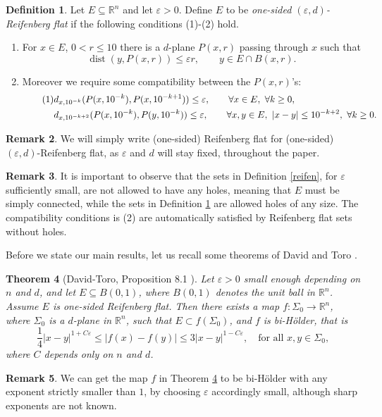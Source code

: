 \documentclass[11pt, twoside, leqno]{article}
\numberwithin{equation}{section}
\newcommand\numberthis{\addtocounter{equation}{1}\tag{\theequation}}
\theoremstyle{plain}
\newtheorem{thm}{Theorem}[section]
\theoremstyle{definition}
\newtheorem{rk}[thm]{Remark}
\newtheorem{defin}[thm]{Definition}
\newcommand{\R}{\mathbb{R}}
\newcommand{\e}{\varepsilon} %
\newcommand{\dist}{\operatorname{dist}}
\begin{document}
\begin{defin} \label{reifenhole}
Let $E \subseteq \R^n$
 and let $\e >0$. Define $E$ to be \emph{one-sided $(\e,d)$-Reifenberg flat} if the following conditions (1)-(2) hold. 
\begin{enumerate}
\item[(1)] For $x \in E$, $0 < r \leq 10$ there is a $d$-plane $P(x,r)$ passing through $x$ such that
\[
\dist(y, P(x,r)) \leq \e r, \qquad y \in E \cap B(x,r).
\]
\item[(2)] Moreover we require some compatibility between the $P(x,r)$'s:
\begin{align*} \numberthis
& d_{x,10^{-k}}(P(x,10^{-k}),P(x,10^{-k+1})) \leq \e, \qquad \forall x\in E, \ \forall k \geq 0, \\
&  d_{x,10^{-k+2}}(P(x,10^{-k}),P(y,10^{-k})) \leq \e, \qquad \forall x,y \in E, \ |x-y| \leq 10^{-k+2}, \ \forall k \geq 0.
\end{align*}
\end{enumerate}
\end{defin}
\begin{rk}
We will simply write (one-sided) Reifenberg flat for (one-sided) $(\e,d)$-Reifenberg flat, as $\e$ and $d$ will stay fixed, throughout the paper.
\end{rk}
\begin{rk}
It is important to observe that the sets in Definition \ref{reifen}, for $\e$ sufficiently small, are not allowed to have any holes, meaning that $E$ must be simply connected, while the sets in Definition \ref{reifenhole} are allowed holes of any size. The compatibility conditions is (2) are automatically satisfied by Reifenberg flat sets without holes.
\end{rk}

Before we state our main results, let us recall some theorems of David and Toro \cite{davidtoro}.

\begin{thm} [David-Toro,  Proposition 8.1  \cite{davidtoro}] \label{f}
Let $\e>0$ small enough depending on $n$ and $d$, and let $E \subseteq B(0,1)$, where $B(0,1)$ denotes the unit ball in $\R^n$. Assume $E$ is one-sided Reifenberg flat. Then there exists a map $f \colon \Sigma_0 \to \R^n$, where $\Sigma_0$ is a $d$-plane in $\R^n$, such that $E \subset f(\Sigma_0)$, and $f$ is bi-H\"{o}lder, that is
\begin{equation}
\frac14 |x-y|^{1+C\e} \leq |f(x)-f(y)| \leq 3 |x-y|^{1-C\e}, \quad \text{for all $x,y \in \Sigma_0$},
\end{equation}
where $C$ depends only on $n$ and $d$.

\end{thm}
\begin{rk}
We can get the map $f$ in Theorem \ref{f} to be bi-H\"{o}lder with any exponent strictly smaller than $1$, by choosing $\e$ accordingly small, although sharp exponents are not known.
\end{rk}
\end{document}
